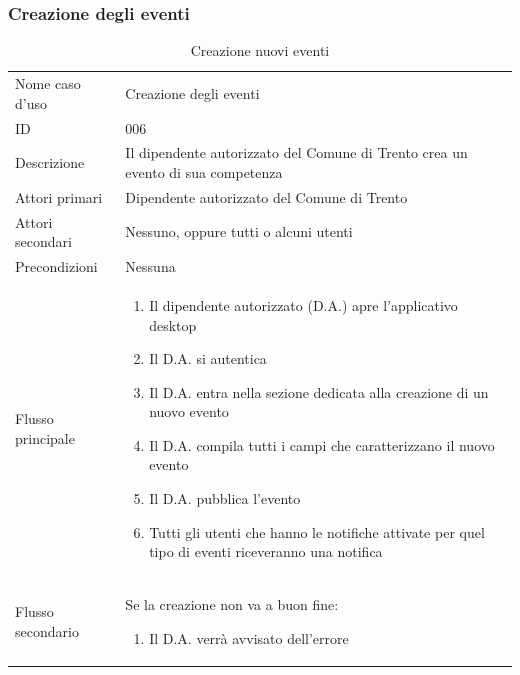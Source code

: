 \documentclass{article}
\begin{document}
\clearpage

\subsubsection{Creazione degli eventi}

\begin{table}[htbp]
    \label{8.3.2}
    \centering
    \begin{tabularx}{\textwidth}{| l | p{} |}
        \Xhline{2pt} %
        Nome caso d'uso & Creazione degli eventi \\
        \Xhline{2pt} %
        ID & 006 \\
        \hline
        Descrizione & Il dipendente autorizzato del Comune di Trento crea un evento di sua competenza\\
        \hline
        Attori primari & Dipendente autorizzato del Comune di Trento\\
        \hline
        Attori secondari & Nessuno, oppure tutti o alcuni utenti \\
        \hline
        Precondizioni & Nessuna \\
        \hline
        Flusso principale & 
        \begin{enumerate}[topsep=5pt,partopsep=0pt,parsep=0pt,itemsep=0pt,before=\vspace{-\baselineskip},after=\vspace{-\baselineskip}]                
            \item Il dipendente autorizzato (D.A.) apre l'applicativo desktop
            \item Il D.A. si autentica
            \item Il D.A. entra nella sezione dedicata alla creazione di un nuovo evento
            \item Il D.A. compila tutti i campi che caratterizzano il nuovo evento
            \item Il D.A. pubblica l'evento
            \item Tutti gli utenti che hanno le notifiche attivate per quel tipo di eventi riceveranno una notifica
        \end{enumerate}
        \\
        \hline
        Flusso secondario & 
        Se la creazione non va a buon fine:
        \begin{enumerate}[topsep=10pt,partopsep=0pt,parsep=0pt,itemsep=0pt,before=\vspace{-\baselineskip},after=\vspace{-\baselineskip}]                
            \item Il D.A. verrà avvisato dell'errore
        \end{enumerate}
        \\
        \hline
    \end{tabularx}
    \caption{Creazione nuovi eventi}
    \label{tab:tabella_use_case006}
\end{table}
\end{document}
